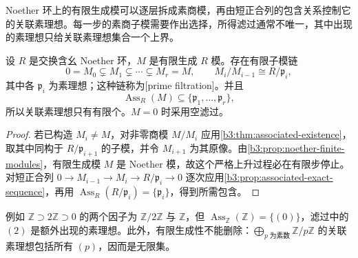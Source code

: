 Noether 环上的有限生成模可以逐层拆成素商模，再由短正合列的包含关系控制它的关联素理想。每一步的素商子模需要作出选择，所得滤过通常不唯一，其中出现的素理想只给关联素理想集合一个上界。

\begin{theorem}\label{b3:thm:associated-finite}
	设 \(R\) 是交换含幺 Noether 环，\(M\) 是有限生成 \(R\) 模。存在有限子模链
	\[
		0=M_0\subsetneq M_1\subsetneq\cdots\subsetneq M_r=M, \qquad M_i/M_{i-1}\cong R/\mathfrak p_i,
	\]
	其中各 \(\mathfrak p_i\) 为素理想；这种链称为[prime filtration]。并且
	\[
		\operatorname{Ass}_R(M)\subseteq\{\mathfrak p_1,\ldots,\mathfrak p_r\},
	\]
	所以关联素理想只有有限个。\(M=0\) 时采用空滤过。
\end{theorem}
\begin{proof}
	若已构造 \(M_i\ne M\)，对非零商模 \(M/M_i\) 应用\cref{b3:thm:associated-existence}，取其中同构于 \(R/\mathfrak p_{i+1}\) 的子模，并令 \(M_{i+1}\) 为其原像。由\cref{b3:prop:noether-finite-modules}，有限生成模 \(M\) 是 Noether 模，故这个严格上升过程必在有限步停止。对短正合列 \(0\rightarrow M_{i-1}\rightarrow M_i\rightarrow R/\mathfrak p_i\rightarrow0\) 逐次应用\cref{b3:prop:associated-exact-sequence}，再用 \(\operatorname{Ass}_R(R/\mathfrak p_i)=\{\mathfrak p_i\}\)，得到所需包含。
\end{proof}

例如 \(\mathbb Z\supset2\mathbb Z\supset0\) 的两个因子为 \(\mathbb Z/2\mathbb Z\) 与 \(\mathbb Z\)，但 \(\operatorname{Ass}_{\mathbb Z}(\mathbb Z)=\bigl\{(0)\bigr\}\)，滤过中的 \((2)\) 是额外出现的素理想。此外，有限生成性不能删除：\(\bigoplus_{p\;\text{为素数}}\mathbb Z/p\mathbb Z\) 的关联素理想包括所有 \((p)\)，因而是无限集。

